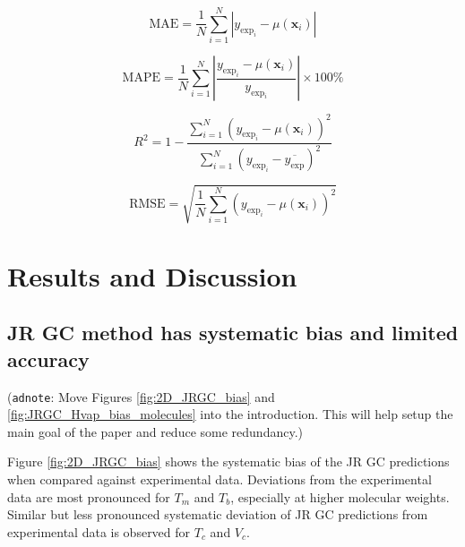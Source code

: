 \documentclass[journal=jacsat,manuscript=article]{achemso}
\newcommand{\alltodo}[1]{{\color{Cyan} (\texttt{alltodo}: #1)}}
\newcommand{\adnote}[1]{{\color{OliveGreen} (\texttt{adnote}: #1)}}
\begin{document}
\begin{equation}
    \text{MAE} = \frac{1}{N} \sum_{i=1}^{N} \left| y_{\text{exp}_i} - \mu(\mathbf{x}_i) \right|
    \label{eq:MAE}
\end{equation}


\begin{equation}
    \text{MAPE} = \frac{1}{N} \sum_{i=1}^{N} \left| \frac{y_{\text{exp}_i} - \mu(\mathbf{x}_i)}{y_{\text{exp}_i}} \right| \times 100\%
    \label{eq:MAPD}
\end{equation}

\begin{equation}
    R^2 = 1 - \frac{\sum_{i=1}^{N} \left( y_{\text{exp}_i} - \mu(\mathbf{x}_i) \right)^2}{\sum_{i=1}^{N} \left( y_{\text{exp}_i} - \overline{y_{\text{exp}}} \right)^2}
    \label{eq:COD}
\end{equation}

\begin{equation}
    \text{RMSE} = \sqrt{\frac{1}{N} \sum_{i=1}^{N} \left( y_{\text{exp}_i} - \mu(\mathbf{x}_i) \right)^2}
    \label{eq:RMSE}
\end{equation}

\section{Results and Discussion}

\subsection{JR GC method has systematic bias and limited accuracy}

\adnote{Move Figures \ref{fig:2D_JRGC_bias} and \ref{fig:JRGC_Hvap_bias_molecules} into the introduction. This will help setup the main goal of the paper and reduce some redundancy.}

Figure \ref{fig:2D_JRGC_bias} shows the systematic bias of the JR GC predictions when compared against experimental data. Deviations from the experimental data are most pronounced for $T_m$ and $T_b$, especially at higher molecular weights. Similar but less pronounced systematic deviation of JR GC predictions from experimental data is observed for $T_c$ and $V_c$.   
\end{document}
